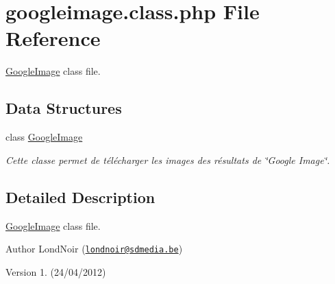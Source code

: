 \hypertarget{googleimage_8class_8php}{\section{googleimage.\-class.\-php File Reference}
\label{googleimage_8class_8php}
}


\hyperlink{class_google_image}{Google\-Image} class file.  


\subsection*{Data Structures}
\begin{DoxyCompactItemize}
\item 
class \hyperlink{class_google_image}{Google\-Image}
\begin{DoxyCompactList}\small\item\em Cette classe permet de télécharger les images des résultats de \char`\"{}\-Google Image\char`\"{}. \end{DoxyCompactList}\end{DoxyCompactItemize}


\subsection{Detailed Description}
\hyperlink{class_google_image}{Google\-Image} class file. \begin{DoxyAuthor}{Author}
Lond\-Noir (\href{mailto:londnoir@sdmedia.be}{\tt londnoir@sdmedia.\-be}) 
\end{DoxyAuthor}
\begin{DoxyVersion}{Version}
1. (24/04/2012) 
\end{DoxyVersion}
